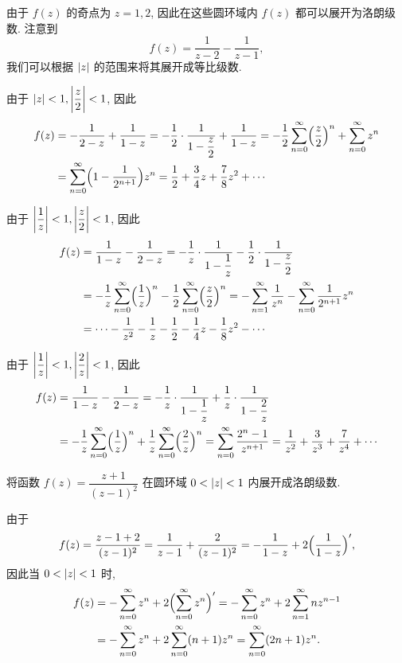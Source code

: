 \begin{solution}
  由于 $f(z)$ 的奇点为 $z=1,2$, 因此在这些圆环域内 $f(z)$ 都可以展开为洛朗级数.
  注意到
  \[
    f(z)=\frac1{z-2}-\frac1{z-1},
  \]
  我们可以根据 $\lvert z\rvert$ 的范围来将其展开成等比级数.
  \begin{enumr}
    \item 由于 $\lvert z\rvert<1,\biggl\vert\dfrac z2\biggr\vert<1$, 因此
      \begin{align*}
         f(z)&
        =-\frac1{2-z}+\frac1{1-z}
        =-\frac{1}{2}\cdot\frac1{1-\dfrac z2}+\frac1{1-z}
        =-\frac{1}{2}\displaystyle\sum_{n=0}^{\infty} \Bigl(\frac z2\Bigr)^n+\displaystyle\sum_{n=0}^{\infty} z^n\\&
        =\displaystyle\sum_{n=0}^{\infty} \Bigl(1-\frac1{2^{n+1}}\Bigr)z^n
        =\frac12+\frac34z+\frac78z^2+\cdots
      \end{align*}
    \item 由于 $\biggl\vert\dfrac 1z\biggr\vert<1,\biggl\vert\dfrac z2\biggr\vert<1$, 因此
      \begin{align*}
         f(z)&
        =\frac1{1-z}-\frac1{2-z}
        =-\frac1z\cdot\frac1{1-\dfrac1z}-\frac{1}{2}\cdot\frac1{1-\dfrac z2}\\&
        =-\frac1z\displaystyle\sum_{n=0}^{\infty} \Bigl(\frac1z\Bigr)^n-\frac{1}{2}\displaystyle\sum_{n=0}^{\infty} \Bigl(\frac z2\Bigr)^n
        =-\displaystyle\sum_{n=1}^{\infty} \frac1{z^n}-\displaystyle\sum_{n=0}^{\infty} \frac1{2^{n+1}}z^n\\&
        =\cdots-\frac1{z^2}-\frac1z-\frac{1}{2} -\frac14z-\frac18z^2-\cdots
      \end{align*}
    \item 由于 $\biggl\vert\dfrac 1z\biggr\vert<1,\biggl\vert\dfrac 2z\biggr\vert<1$, 因此
      \begin{align*}
         f(z)&
        =\frac1{1-z}-\frac1{2-z}
        =-\frac1z\cdot\frac1{1-\dfrac1z}+\frac1z\cdot\frac1{1-\dfrac2z}\\&
        =-\frac1z\displaystyle\sum_{n=0}^{\infty} \Bigl(\frac1z\Bigr)^n+\frac1z\displaystyle\sum_{n=0}^{\infty} \Bigl(\frac2z\Bigr)^n
        =\displaystyle\sum_{n=0}^{\infty} \frac{2^n-1}{z^{n+1}}
        =\frac1{z^2}+\frac3{z^3}+\frac7{z^4}+\cdots
      \end{align*}
  \end{enumr}
\end{solution}

\begin{example}
  将函数 $f(z)=\dfrac{z+1}{(z-1)^2}$ 在圆环域 $0<\lvert z\rvert<1$ 内展开成洛朗级数.
\end{example}

\begin{solution}[解法一]
  由于
  \[
     f(z)
    =\frac{z-1+2}{(z-1)^2}
    =\frac1{z-1}+\frac{2}{(z-1)^2}
    =-\frac1{1-z}+2\Bigl(\frac1{1-z}\Bigr)',
  \]
  因此当 $0<\lvert z\rvert<1$ 时,
  \begin{align*}
      f(z)&
    =-\displaystyle\sum_{n=0}^{\infty} z^n+2\Bigl(\displaystyle\sum_{n=0}^{\infty} z^n\Bigr)'
    =-\displaystyle\sum_{n=0}^{\infty} z^n+2\displaystyle\sum_{n=1}^{\infty} nz^{n-1}\\&
    =-\displaystyle\sum_{n=0}^{\infty} z^n+2\displaystyle\sum_{n=0}^{\infty} (n+1)z^n
    =\displaystyle\sum_{n=0}^{\infty} (2n+1)z^n.
  \end{align*}
\end{solution}

